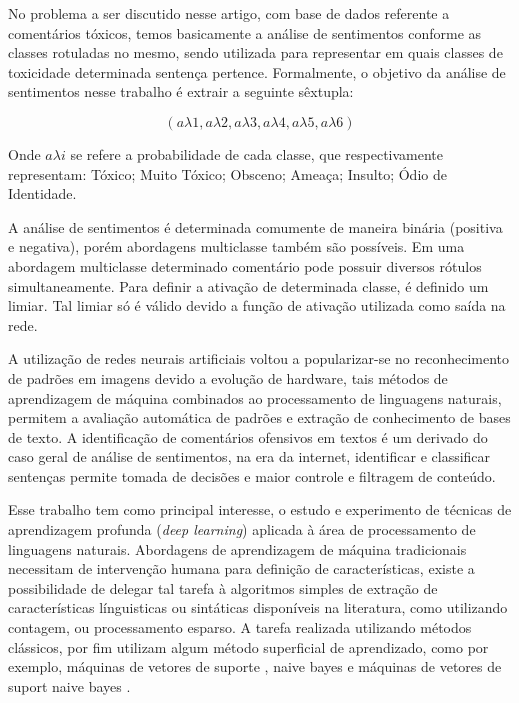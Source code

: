 \documentclass[12pt]{article}
\begin{document}
No problema a ser discutido nesse artigo, com base de dados referente a comentários tóxicos, temos basicamente a análise de sentimentos conforme as classes rotuladas no mesmo, sendo utilizada para representar em quais classes de toxicidade determinada sentença pertence. Formalmente, o objetivo da análise de sentimentos nesse trabalho é extrair a seguinte sêxtupla:

\[
(a\lambda1, a\lambda2, a\lambda3, a\lambda4, a\lambda5, a\lambda6)
\]

Onde $a \lambda i$ se refere a probabilidade de cada classe, que respectivamente representam: Tóxico; Muito Tóxico; Obsceno; Ameaça; Insulto; Ódio de Identidade.

A análise de sentimentos é determinada comumente de maneira binária (positiva e negativa), porém abordagens multiclasse também são possíveis. Em uma abordagem multiclasse determinado comentário pode possuir diversos rótulos simultaneamente. Para definir a ativação de determinada classe, é definido um limiar. Tal limiar só é válido devido a função de ativação utilizada como saída na rede.

A utilização de redes neurais artificiais voltou a popularizar-se no reconhecimento de padrões em imagens devido a evolução de hardware, tais métodos de aprendizagem de máquina combinados ao processamento de linguagens naturais, permitem a avaliação automática de padrões e extração de conhecimento de bases de texto. A identificação de comentários ofensivos em textos é um derivado do caso geral de análise de sentimentos, na era da internet, identificar e classificar sentenças permite tomada de decisões e maior controle e filtragem de conteúdo. 

Esse trabalho tem como principal interesse, o estudo e experimento de técnicas de aprendizagem profunda (\textit{deep learning}) aplicada à área de processamento de linguagens naturais. Abordagens de aprendizagem de máquina tradicionais necessitam de intervenção humana para definição de características, existe a possibilidade de delegar tal tarefa à algoritmos simples de extração de características línguisticas ou sintáticas disponíveis na literatura, como utilizando contagem, ou processamento esparso. A tarefa realizada utilizando métodos clássicos, por fim utilizam algum método superficial de aprendizado, como por exemplo, máquinas de vetores de suporte \cite{DBLP:journals/ml/CortesV95}, naive bayes e máquinas de vetores de suport naive bayes  \cite{wang:2012}.
\end{document}

